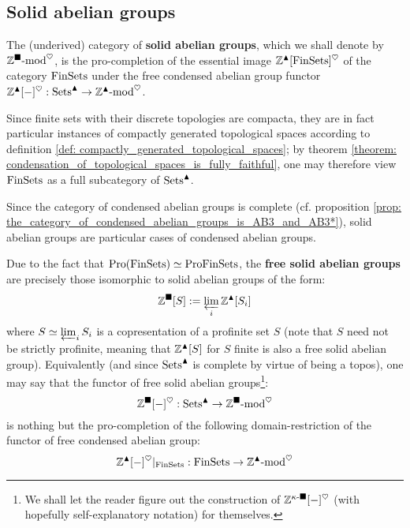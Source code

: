         \subsection{Solid abelian groups}
            \begin{definition} \label{def: solid_abelian_groups}
                The (underived) category of \textbf{solid abelian groups}, which we shall denote by $\Z^{\solid}\mod^{\heart}$, is the pro-completion of the essential image $\Z^{\cond}[\Fin\Sets]^{\heart}$ of the category $\Fin\Sets$ under the free condensed abelian group functor $\Z^{\cond}[-]^{\heart}: \Sets^{\cond} \to \Z^{\cond}\mod^{\heart}$.
            \end{definition}
            \begin{remark}
                Since finite sets with their discrete topologies are compacta, they are in fact particular instances of compactly generated topological spaces according to definition \ref{def: compactly_generated_topological_spaces}; by theorem \ref{theorem: condensation_of_topological_spaces_is_fully_faithful}, one may therefore view $\Fin\Sets$ as a full subcategory of $\Sets^{\cond}$. 
            \end{remark}
            \begin{remark} \label{remark: solid_abelian_groups_are_condensed}
                Since the category of condensed abelian groups is complete (cf. proposition \ref{prop: the_category_of_condensed_abelian_groups_is_AB3_and_AB3*}), solid abelian groups are particular cases of condensed abelian groups.
            \end{remark}
            \begin{remark} \label{remark: free_solid_abelian_groups}
                Due to the fact that $\Pro(\Fin\Sets) \cong \Pro\Fin\Sets$, the \textbf{free solid abelian groups} are precisely those isomorphic to solid abelian groups of the form:
                    $$\Z^{\solid}[S] := \projlim_i \Z^{\cond}[S_i]$$
                where $S \cong \projlim_i S_i$ is a copresentation of a profinite set $S$ (note that $S$ need not be strictly profinite, meaning that $\Z^{\cond}[S]$ for $S$ finite is also a free solid abelian group). Equivalently (and since $\Sets^{\cond}$ is complete by virtue of being a topos), one may say that the functor of free solid abelian groups\footnote{We shall let the reader figure out the construction of $\Z^{\kappa\-\solid}[-]^{\heart}$ (with hopefully self-explanatory notation) for themselves.}:
                    $$\Z^{\solid}[-]^{\heart}: \Sets^{\cond} \to \Z^{\solid}\mod^{\heart}$$
                is nothing but the pro-completion of the following domain-restriction of the functor of free condensed abelian group:
                    $$\Z^{\cond}[-]^{\heart}|_{\Fin\Sets}: \Fin\Sets \to \Z^{\cond}\mod^{\heart}$$
            \end{remark}
